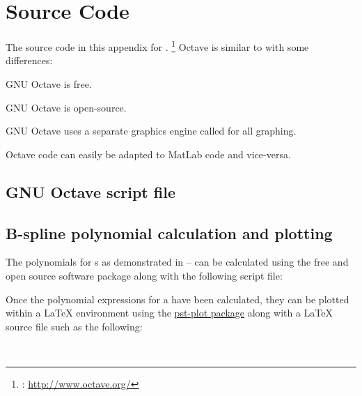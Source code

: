 
\chapter{Source Code}
\label{app:src_code}
\label{app:sourcecode}
The source code in this appendix for .
\footnote{ : \url{http://www.octave.org/}}
Octave is similar to  with some differences:
\begin{enume}
  \item GNU Octave is free.
  \item GNU Octave is open-source.
  \item GNU Octave uses a separate graphics engine called 
        for all graphing.
\end{enume}
Octave code can easily be adapted to MatLab code and vice-versa.



\section{GNU Octave script file}
\label{sec:src_Ry}


\section{B-spline polynomial calculation and plotting}
\label{sec:src_bspline_max}
The polynomials for s as demonstrated in --
can be calculated using the free and open source software package 
along with the following script file:
\\


\begin{minipage}{\tw-65mm}
Once the polynomial expressions for a  have been calculated, 
they can be plotted within a {\LaTeX} environment using the 
\href{http://www.ctan.org/pkg/pst-plot}{pst-plot package}
along with a {\LaTeX} source file such as the following:\footnotemark
\end{minipage}\hfill{}%
\\


